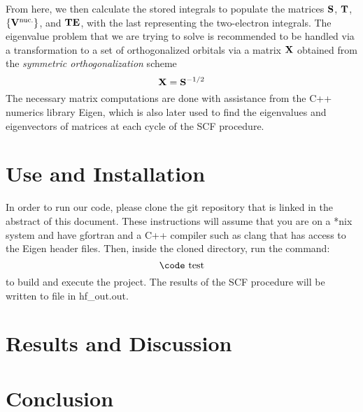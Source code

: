 \documentclass[%
 aip,
 amsmath,amssymb,
 reprint,%
]{revtex4-1}
\begin{document}
From here, we then calculate the stored integrals to populate the matrices 
$\bold{S}$, $\bold{T}$, $\left\{\bold{V}^{\text{nuc.}}\right\}$, and $\bold{TE}$,
with the last representing the two-electron integrals. The eigenvalue problem
that we are trying to solve is recommended to be handled via a transformation
to a set of orthogonalized orbitals via a matrix $\bold{X}$ obtained from 
the \emph{symmetric orthogonalization} scheme
%
\begin{equation}
\bold{X} = \bold{S}^{-1/2}
\end{equation}
%
The necessary matrix computations are done with assistance from the C++
numerics library Eigen\cite{eigenweb}, which is also later used to find the 
eigenvalues and eigenvectors of matrices at each cycle of the SCF procedure.


\section{Use and Installation}
In order to run our code, please clone the git repository that is linked in
the abstract of this document. These instructions will assume that you are
on a *nix system and have {\code gfortran} and a C++ compiler such as 
{\code clang} that has access to the Eigen header files. Then, inside the
cloned directory, run the command: 
%
$$ \text{{\code test}} $$
to build and execute the project. The results of the SCF procedure will be
written to file in {\code hf\_out.out}.

\section{Results and Discussion}


\section{Conclusion}





\end{document}
